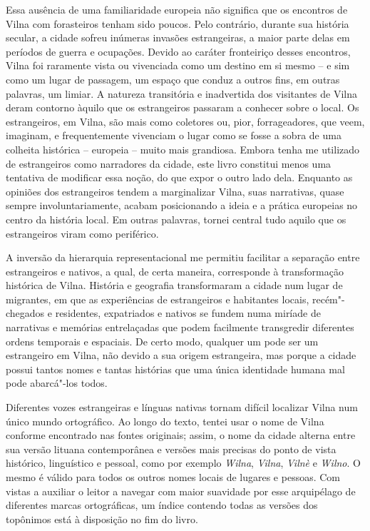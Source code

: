 Essa ausência de uma familiaridade europeia não significa que os
encontros de Vilna com forasteiros tenham sido poucos. Pelo contrário,
durante sua história secular, a cidade sofreu inúmeras invasões
estrangeiras, a maior parte delas em períodos de guerra e ocupações.
Devido ao caráter fronteiriço desses encontros, Vilna foi raramente
vista ou vivenciada como um destino em si mesmo -- e sim como um lugar de
passagem, um espaço que conduz a outros fins, em outras palavras, um
limiar. A natureza transitória e inadvertida dos visitantes de Vilna
deram contorno àquilo que os estrangeiros passaram a conhecer sobre o
local. Os estrangeiros, em Vilna, são mais como coletores ou, pior,
forrageadores, que veem, imaginam, e frequentemente vivenciam o lugar
como se fosse a sobra de uma colheita histórica -- europeia -- muito mais
grandiosa. Embora tenha me utilizado de estrangeiros como narradores da
cidade, este livro constitui menos uma tentativa de modificar essa
noção, do que expor o outro lado dela. Enquanto as opiniões dos
estrangeiros tendem a marginalizar Vilna, suas narrativas, quase sempre
involuntariamente, acabam posicionando a ideia e a prática europeias no
centro da história local. Em outras palavras, tornei central tudo aquilo
que os estrangeiros viram como periférico.

A inversão da hierarquia representacional me permitiu facilitar a
separação entre estrangeiros e nativos, a qual, de certa maneira,
corresponde à transformação histórica de Vilna. História e geografia
transformaram a cidade num lugar de migrantes, em que as experiências de
estrangeiros e habitantes locais, recém"-chegados e residentes,
expatriados e nativos se fundem numa miríade de narrativas e memórias
entrelaçadas que podem facilmente transgredir diferentes ordens
temporais e espaciais. De certo modo, qualquer um pode ser um
estrangeiro em Vilna, não devido a sua origem estrangeira, mas porque a
cidade possui tantos nomes e tantas histórias que uma única identidade
humana mal pode abarcá"-los todos.

Diferentes vozes estrangeiras e línguas nativas tornam difícil localizar
Vilna num único mundo ortográfico. Ao longo do texto, tentei usar o nome
de Vilna conforme encontrado nas fontes originais; assim, o nome da
cidade alterna entre sua versão lituana contemporânea e versões mais
precisas do ponto de vista histórico, linguístico e pessoal, como por
exemplo \textit{Wilna}, \textit{Vilna}, \textit{Vilnè} e \textit{Wilno}. O mesmo
é válido para todos os outros nomes locais de lugares e pessoas. Com
vistas a auxiliar o leitor a navegar com maior suavidade por esse
arquipélago de diferentes marcas ortográficas, um índice contendo todas
as versões dos topônimos está à disposição no fim do livro.

